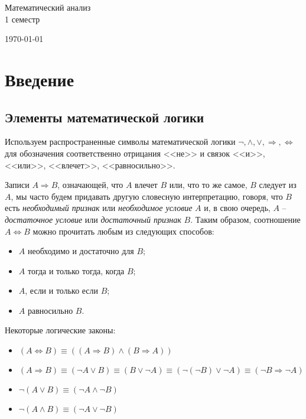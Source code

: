\documentclass[14pt, a4paper]{article}
\theoremstyle{definition}
\theoremstyle{remark}
\begin{document}
\hfill \break
\hfill \break
\hfill \break
\hfill \break
\hfill \break
\hfill \break
\begin{center}
\Huge{Математический анализ} \\[2cm]
\LARGE{1 семестр} \\
\end{center}
\hfill \break
\begin{center} \today \end{center}
\thispagestyle{empty}
\newpage
\tableofcontents
\thispagestyle{empty}
\newpage
{}

\section{Введение}
\subsection{Элементы математической логики}
Используем распространенные символы математической логики $\neg, \wedge, \vee, \Rightarrow, \Leftrightarrow$ для обозначения соответственно отрицания <<не>> и связок <<и>>, <<или>>, <<влечет>>, <<равносильно>>.


Записи $A \Rightarrow B$, означающей, что $A$ влечет $B$ или, что то же самое, $B$ следует из $A$, мы часто будем придавать другую словесную интерпретацию, говоря, что $B$ есть \textit{необходимый признак} или \textit{необходимое условие} $A$ и, в свою очередь, $A$ -- \textit{достаточное условие} или \textit{достаточный признак} $B$.
Таким образом, соотношение $A \Leftrightarrow B$ можно прочитать любым из следующих способов:
\begin{itemize}
    \item[] $A$ необходимо и достаточно для $B$;
    \item[] $A$ тогда и только тогда, когда $B$;
    \item[] $A$, если и только если $B$;
    \item[] $A$ равносильно $B$.
\end{itemize}

Некоторые логические законы:
\begin{itemize}
    \item[] $(A \Leftrightarrow B) \equiv ((A \Rightarrow B) \wedge (B \Rightarrow A))$
    \item[] $(A \Rightarrow B) \equiv (\neg A \vee B) \equiv (B \vee \neg A) \equiv (\neg (\neg B) \vee \neg A) \equiv (\neg B \Rightarrow \neg A)$
    \item[] $\neg (A \vee B) \equiv (\neg A \wedge \neg B)$
    \item[] $\neg (A \wedge B) \equiv (\neg A \vee \neg B)$
\end{itemize}
\end{document}
